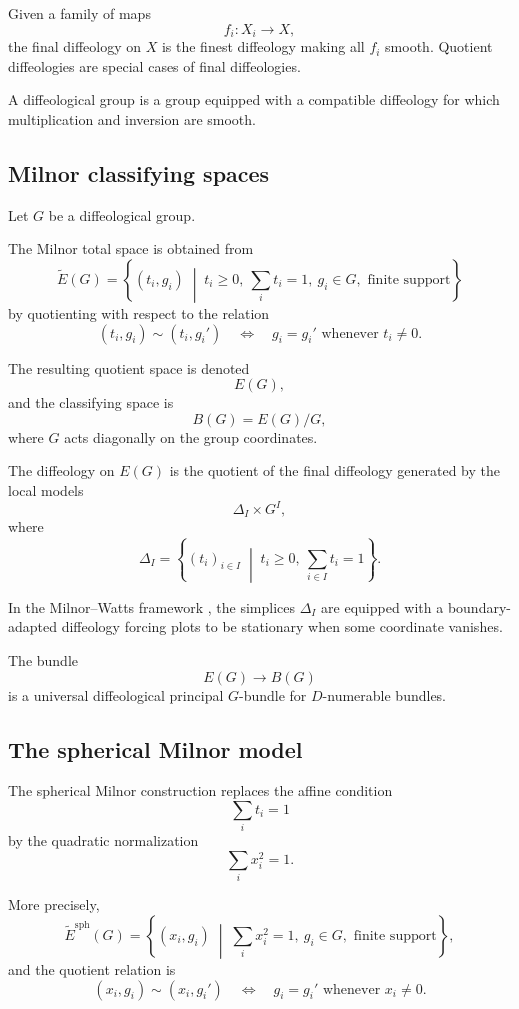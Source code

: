 \documentclass[11pt]{amsart}
\begin{document}
Given a family of maps
\[
f_i:X_i\to X,
\]
the final diffeology on \(X\) is the finest diffeology making all \(f_i\)
smooth. Quotient diffeologies are special cases of final diffeologies.

A diffeological group is a group equipped with a compatible diffeology for
which multiplication and inversion are smooth.

\subsection{Milnor classifying spaces}

Let \(G\) be a diffeological group.

The Milnor total space is obtained from
\[
\widetilde E(G)
=
\left\{
(t_i,g_i)
\;\middle|\;
t_i\ge0,\ 
\sum_i t_i=1,\ 
g_i\in G,
\text{ finite support}
\right\}
\]
by quotienting with respect to the relation
\[
(t_i,g_i)\sim(t_i,g_i')
\quad\Longleftrightarrow\quad
g_i=g_i'
\text{ whenever }t_i\neq0.
\]

The resulting quotient space is denoted
\[
E(G),
\]
and the classifying space is
\[
B(G)=E(G)/G,
\]
where \(G\) acts diagonally on the group coordinates.

The diffeology on \(E(G)\) is the quotient of the final diffeology generated
by the local models
\[
\Delta_I\times G^I,
\]
where
\[
\Delta_I
=
\left\{
(t_i)_{i\in I}
\;\middle|\;
t_i\ge0,\ 
\sum_{i\in I}t_i=1
\right\}.
\]

In the Milnor--Watts framework \cite{MagnotWatts2017}, the simplices
\(\Delta_I\) are equipped with a boundary-adapted diffeology forcing plots to
be stationary when some coordinate vanishes.

The bundle
\[
E(G)\to B(G)
\]
is a universal diffeological principal \(G\)-bundle for \(D\)-numerable
bundles.

\subsection{The spherical Milnor model}

The spherical Milnor construction replaces the affine condition
\[
\sum_i t_i=1
\]
by the quadratic normalization
\[
\sum_i x_i^2=1.
\]

More precisely,
\[
\widetilde E^{\mathrm{sph}}(G)
=
\left\{
(x_i,g_i)
\;\middle|\;
\sum_i x_i^2=1,\ 
g_i\in G,
\text{ finite support}
\right\},
\]
and the quotient relation is
\[
(x_i,g_i)\sim(x_i,g_i')
\quad\Longleftrightarrow\quad
g_i=g_i'
\text{ whenever }x_i\neq0.
\]
\end{document}
